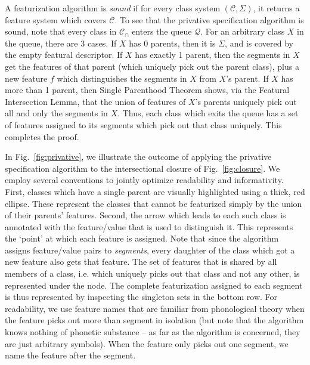 \documentclass[11pt, oneside]{article}   	%
\begin{document}
A featurization algorithm is \textit{sound} if for every class system $(\mathcal C, \Sigma)$, it returns a feature system which covers $\mathcal C$. To see that the privative specification algorithm is sound, note that every class in $\mathcal C_\cap$ enters the queue $\mathcal Q$. For an arbitrary class $X$ in the queue, there are 3 cases. If $X$ has 0 parents, then it is $\Sigma$, and is covered by the empty featural descriptor. If $X$ has exactly 1 parent, then the segments in $X$ get the features of that parent (which uniquely pick out the parent class), plus a new feature $f$ which distinguishes the segments in $X$ from $X$'s parent. If $X$ has more than 1 parent, then Single Parenthood Theorem shows, via the Featural Intersection Lemma, that the union of features of $X$'s parents uniquely pick out all and only the segments in $X$. Thus, each class which exits the queue has a set of features assigned to its segments which pick out that class uniquely. This completes the proof.

\vspace{\baselineskip} In Fig.~\ref{fig:privative}, we illustrate the outcome of applying the privative specification algorithm to the intersectional closure of Fig.~\ref{fig:closure}. We employ several conventions to jointly optimize readability and informativity. First, classes which have a single parent are visually highlighted using a thick, red ellipse. These represent the classes that cannot be featurized simply by the union of their parents' features. Second, the arrow which leads to each such class is annotated with the feature/value that is used to distinguish it. This represents the `point' at which each feature is assigned. Note that since the algorithm assigns feature/value pairs to \textit{segments}, every daughter of the class which got a new feature also gets that feature. The set of features that is shared by all members of a class, i.e. which uniquely picks out that class and not any other, is represented under the node. The complete featurization assigned to each segment is thus represented by inspecting the singleton sets in the bottom row. For readability, we use feature names that are familiar from phonological theory when the feature picks out more than segment in isolation (but note that the algorithm knows nothing of phonetic substance -- as far as the algorithm is concerned, they are just arbitrary symbols). When the feature only picks out one segment, we name the feature after the segment.
\end{document}
